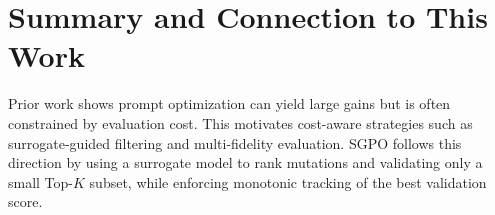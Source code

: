 \section{Summary and Connection to This Work}
Prior work shows prompt optimization can yield large gains but is often constrained by evaluation cost. This motivates cost-aware strategies such as surrogate-guided filtering and multi-fidelity evaluation. SGPO follows this direction by using a surrogate model to rank mutations and validating only a small Top-$K$ subset, while enforcing monotonic tracking of the best validation score.